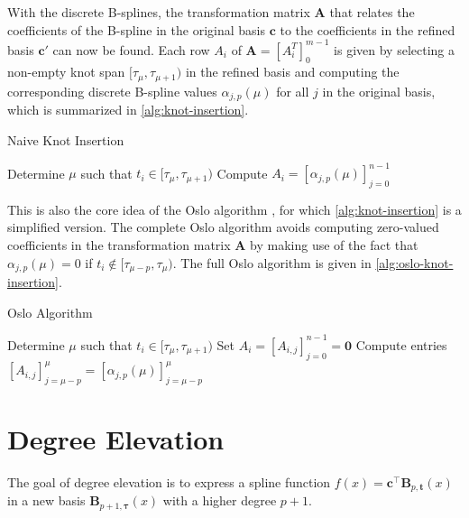 With the discrete B-splines, the transformation matrix $\mathbf A$ that relates the coefficients of the B-spline in the original basis $\mathbf c$ to the coefficients in the refined basis $\mathbf c'$ can now be found. Each row $A_i$ of $\mathbf A = [A_i^T]_0^{m-1}$ is given by selecting a non-empty knot span $[\tau_\mu, \tau_{\mu+1})$ in the refined basis and computing the corresponding discrete B-spline values $\alpha_{j,p}(\mu)$ for all $j$ in the original basis, which is summarized in \cref{alg:knot-insertion}.

\begin{algorithm}
    \caption{Naive Knot Insertion}\label{alg:knot-insertion}
    \begin{algorithmic}
        \State Determine $\mu$ such that $t_i \in [\tau_\mu, \tau_{\mu+1})$
        \State Compute $A_i = [\alpha_{j,p}(\mu)]_{j=0}^{n-1}$
        \EndFor
    \end{algorithmic}
\end{algorithm}

This is also the core idea of the Oslo algorithm \citep{Cohen1980}, for which \cref{alg:knot-insertion} is a simplified version. The complete Oslo algorithm avoids computing zero-valued coefficients in the transformation matrix $\mathbf A$ by making use of the fact that $\alpha_{j,p}(\mu) = 0$ if $t_i \notin [\tau_{\mu-p}, \tau_{\mu})$. The full Oslo algorithm is given in \cref{alg:oslo-knot-insertion}.

\begin{algorithm}
    \caption{Oslo Algorithm}\label{alg:oslo-knot-insertion}
    \begin{algorithmic}
        \State Determine $\mu$ such that $t_i \in [\tau_\mu, \tau_{\mu+1})$
        \State Set $A_i = [A_{i,j}]_{j=0}^{n-1} = \mathbf 0$
        \State Compute entries $[A_{i,j}]_{j=\mu-p}^\mu = [\alpha_{j,p}(\mu)]_{j=\mu-p}^{\mu}$
        \EndFor
    \end{algorithmic}
\end{algorithm}

\section{Degree Elevation}

The goal of degree elevation is to express a spline function $f(x) = \mathbf{c}^{\top} \mathbf{B}_{p, \mathbf{t}}(x)$ in a new basis $\mathbf{B}_{p+1, \boldsymbol{\tau}}(x)$ with a higher degree $p+1$. 

